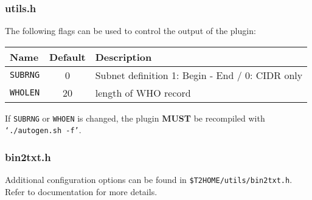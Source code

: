 \documentclass[documentation]{subfiles}
\begin{document}
\subsubsection{utils.h}\label{s:bfo:utils.h}
The following flags can be used to control the output of the plugin:
\begin{table}[!ht]
    \centering
    \begin{tabular}{lcl}
        \toprule
        {\bf Name} & {\bf Default} & {\bf Description}\\
        \midrule
        {\tt\small SUBRNG} & 0  & Subnet definition 1: Begin - End / 0: CIDR only\\
        {\tt\small WHOLEN} & 20 & length of WHO record\\
        \bottomrule
    \end{tabular}
\end{table}
If {\tt SUBRNG} or {\tt WHOEN} is changed, the  plugin {\bf MUST} be recompiled with {\tt `./autogen.sh -f'}.

\subsubsection{bin2txt.h}
Additional configuration options can be found in {\tt \$T2HOME/utils/bin2txt.h}.
Refer to  documentation for more details.
\end{document}
